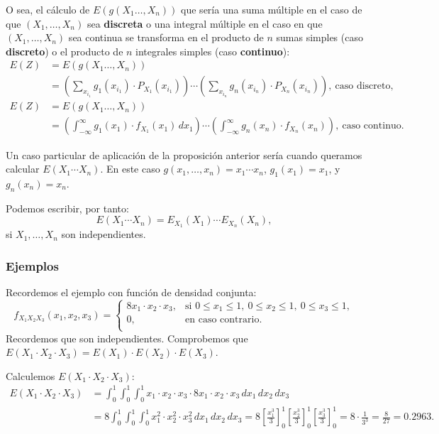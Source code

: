\documentclass[]{book}
\begin{document}
O sea, el cálculo de \(E(g(X_1\ldots,X_n))\) que sería una suma múltiple en el caso de que \((X_1,\ldots,X_n)\) sea \textbf{discreta} o una integral múltiple en el caso en que \((X_1,\ldots,X_n)\) sea continua se transforma en el producto de \(n\) sumas simples (caso \textbf{discreto}) o el producto de \(n\) integrales simples (caso \textbf{continuo}):
\[
\begin{array}{rl}
E(Z) & =E(g(X_1\ldots,X_n))\\ & =\left(\sum_{x_{i_1}} g_1(x_{i_1})\cdot P_{X_1}(x_{i_1})\right)\cdots \left(\sum_{x_{i_n}} g_n(x_{i_n})\cdot P_{X_n}(x_{i_n})\right), \ \mbox{caso discreto},\\
E(Z) & =E(g(X_1\ldots,X_n)) \\ & =\left(\int_{-\infty}^\infty g_1(x_1)\cdot f_{X_1}(x_1)\, dx_1\right)\cdots \left(\int_{-\infty}^\infty g_n(x_n)\cdot f_{X_n}(x_n)\right), \ \mbox{caso continuo}.
\end{array}
\]

Un caso particular de aplicación de la proposición anterior sería cuando queramos calcular \(E(X_1\cdots X_n)\). En este caso \(g(x_1,\ldots,x_n)=x_1\cdots x_n\), \(g_1(x_1)=x_1\), y \(g_n(x_n)=x_n\).

Podemos escribir, por tanto:
\[
E(X_1\cdots X_n)=E_{X_1}(X_1)\cdots E_{X_n}(X_n),
\]
si \(X_1,\ldots,X_n\) son independientes.

\hypertarget{ejemplos-17}{%
\subsubsection{Ejemplos}\label{ejemplos-17}}

Recordemos el ejemplo con función de densidad conjunta:
\[
f_{X_1X_2X_3}(x_1,x_2,x_3)=\begin{cases}
8 x_1\cdot x_2\cdot x_3, & \mbox{si }0\leq x_1\leq 1,\ 0\leq x_2\leq 1,\ 0\leq x_3\leq 1, \\
0, & \mbox{en caso contrario.}\\
\end{cases}
\]
Recordemos que son independientes. Comprobemos que \(E(X_1\cdot X_2\cdot X_3)=E(X_1)\cdot E(X_2)\cdot E(X_3)\).

Calculemos \(E(X_1\cdot X_2\cdot X_3)\):
\[
\begin{array}{rl}
E(X_1\cdot X_2\cdot X_3)  & = \int_0^1\int_0^1\int_0^1 x_1\cdot x_2\cdot x_3\cdot 8 x_1\cdot x_2\cdot x_3\,dx_1\, dx_2\, dx_3 \\ & = 8\int_0^1\int_0^1\int_0^1 x_1^2\cdot x_2^2\cdot x_3^2\,dx_1\, dx_2\, dx_3 =8\left[\frac{x_1^3}{3}\right]_0^1\left[\frac{x_2^3}{3}\right]_0^1
\left[\frac{x_3^3}{3}\right]_0^1 = 8\cdot \frac{1}{3^3}=\frac{8}{27}=0.2963.
\end{array}
\]
\end{document}
